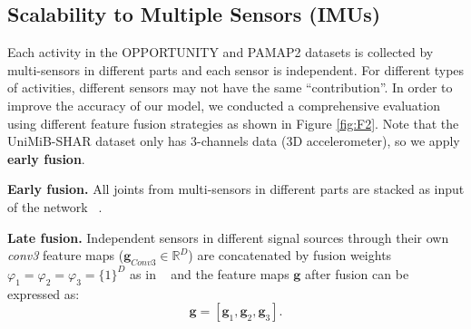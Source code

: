 \documentclass[twoside,twocolumn]{article}
\begin{document}
\subsection{Scalability to Multiple Sensors (IMUs)}\label{sec:fusion_stragegy}
Each activity in the OPPORTUNITY and PAMAP2 datasets is collected by multi-sensors in different parts and each sensor is independent. For different types of activities, different sensors may not have the same ``contribution''. In order to improve the accuracy of our model, we conducted a comprehensive evaluation using different feature fusion strategies as shown in Figure \ref{fig:F2}. Note that the UniMiB-SHAR dataset only has 3-channels data (3D accelerometer), so we apply \textbf{early fusion}.

\textbf{Early fusion.} All joints from multi-sensors in different parts are stacked as input of the network ~\cite{b22,b44}.

\textbf{Late fusion.} Independent sensors in different signal sources through their own \emph{conv3} feature maps ($\boldsymbol{g}_{Conv3}\in \mathbb{R}^D$) are concatenated by fusion weights $\varphi_1=\varphi_2=\varphi_3=\{1\}^D$ as in ~\cite{b19,b45} and the feature maps $\boldsymbol{g}$ after fusion can be expressed as:
$$
\boldsymbol{g}=[\boldsymbol{g}_1,\boldsymbol{g}_2,\boldsymbol{g}_3].
$$
\end{document}
